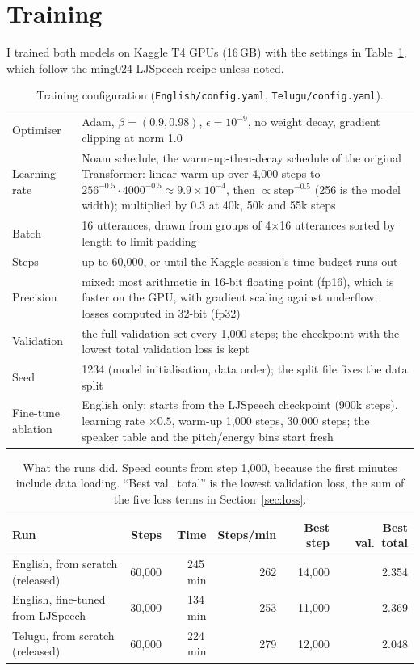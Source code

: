\documentclass[11pt,a4paper]{article}
\newcommand{\code}[1]{\texttt{#1}}
\begin{document}
\section{Training}
\label{sec:training}
I trained both models on Kaggle T4 GPUs (16\,GB) with the settings in Table~\ref{tab:train}, which follow the
ming024 LJSpeech recipe unless noted.

\begin{table}[H]\centering\small
\caption{Training configuration (\code{English/config.yaml}, \code{Telugu/config.yaml}).}
\label{tab:train}
\begin{tabularx}{\linewidth}{@{}lX@{}}
\toprule
Optimiser & Adam, $\beta = (0.9, 0.98)$, $\epsilon = 10^{-9}$, no weight decay, gradient clipping at norm 1.0 \\
Learning rate & Noam schedule, the warm-up-then-decay schedule of the original Transformer: linear warm-up over 4,000 steps to $256^{-0.5}\cdot 4000^{-0.5} \approx 9.9\times10^{-4}$,
then $\propto \mathrm{step}^{-0.5}$ (256 is the model width); multiplied by 0.3 at 40k, 50k and 55k steps \\
Batch & 16 utterances, drawn from groups of 4$\times$16 utterances sorted by length to limit padding \\
Steps & up to 60,000, or until the Kaggle session's time budget runs out \\
Precision & mixed: most arithmetic in 16-bit floating point (fp16), which is faster on the GPU, with gradient
scaling against underflow; losses computed in 32-bit (fp32) \\
Validation & the full validation set every 1,000 steps; the checkpoint with the lowest total validation loss is kept \\
Seed & 1234 (model initialisation, data order); the split file fixes the data split \\
Fine-tune ablation & English only: starts from the LJSpeech checkpoint (900k steps), learning rate $\times0.5$,
warm-up 1,000 steps, 30,000 steps; the speaker table and the pitch/energy bins start fresh \\
\bottomrule
\end{tabularx}
\end{table}

\begin{table}[H]\centering\small
\caption{What the runs did. Speed counts from step 1,000, because the first minutes include data loading. ``Best
val.\ total'' is the lowest validation loss, the sum of the five loss terms in Section~\ref{sec:loss}.}
\label{tab:runs}
\begin{tabular}{@{}lrrrrr@{}}
\toprule
Run & Steps & Time & Steps/min & Best step & Best val.\ total \\
\midrule
English, from scratch (released) & 60,000 & 245\,min & 262 & 14,000 & 2.354 \\
English, fine-tuned from LJSpeech & 30,000 & 134\,min & 253 & 11,000 & 2.369 \\
Telugu, from scratch (released) & 60,000 & 224\,min & 279 & 12,000 & 2.048 \\
\bottomrule
\end{tabular}
\end{table}
\end{document}
